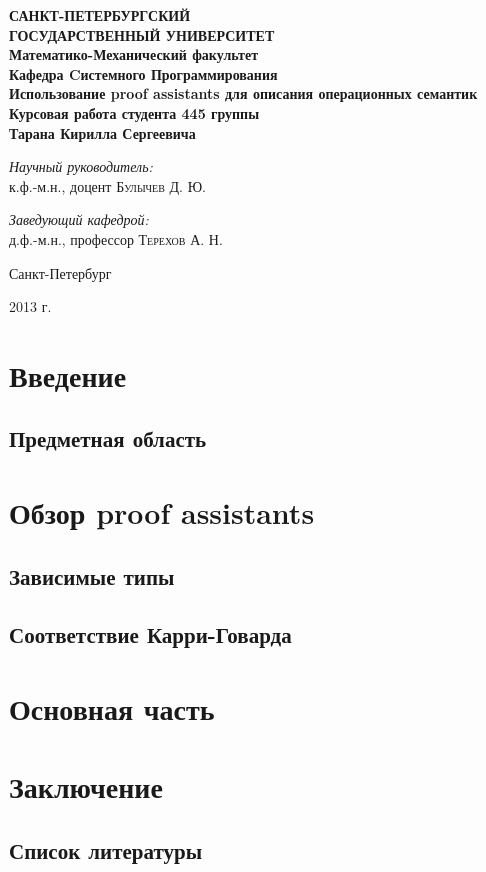 \documentclass[10pt]{article}
\begin{document}
  \begin{titlepage} 
     \begin{center}
        \textbf{\Large САНКТ-ПЕТЕРБУРГСКИЙ \\ ГОСУДАРСТВЕННЫЙ УНИВЕРСИТЕТ} \\[1.0cm]
        \textbf{\large Математико-Механический факультет} \\[0.2cm]
        \textbf{\large Кафедра Cистемного Программирования}\\[3.5cm]

        \textbf{\LARGE Использование proof assistants для описания операционных семантик}\\[1.0cm]
        \textbf{\Large Курсовая работа студента 445 группы} \\[0.2cm]
        \textbf{\Large Тарана Кирилла Сергеевича} \\[3.5cm]

        \begin{flushright} \large \emph{Научный руководитель:} \\ к.ф.-м.н., доцент    \textsc{Булычев Д. Ю.} \end{flushright}
        \begin{flushright} \large \emph{Заведующий кафедрой:}  \\ д.ф.-м.н., профессор \textsc{Терехов А. Н.} \end{flushright}
        \vfill 

        {\large {Санкт-Петербург}} \par
        {\large {2013 г.}}
     \end{center} 
  \end{titlepage}

  \tableofcontents
  \newpage

  \section{Введение}
  \subsection{Предметная область}
  \section{Обзор proof assistants}
  \subsection{Зависимые типы}
  \subsection{Соответствие Карри-Говарда}
  \section{Основная часть}
  \section{Заключение}

  \cite{Bove:2009:DTW:1614478.1614480}

  \subsection{Список литературы}
  
  
\end{document}
